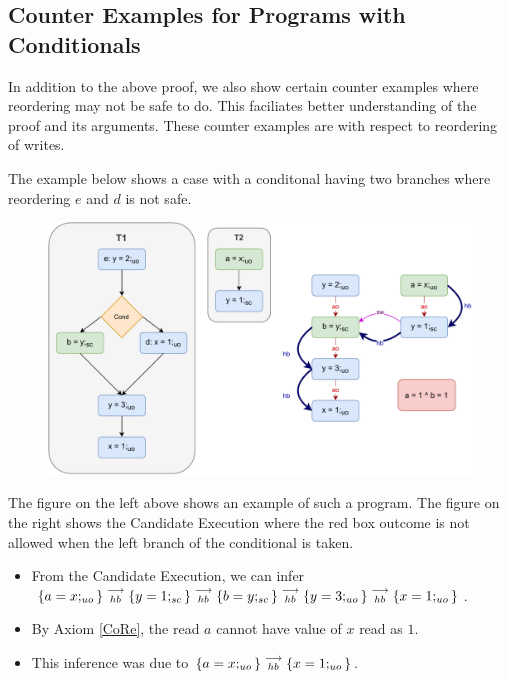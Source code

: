 \subsection{Counter Examples for Programs with Conditionals}
    
        In addition to the above proof, we also show certain counter examples where reordering may not be safe to do. This faciliates better understanding of the proof and its arguments. These counter examples are with respect to reordering of writes. 

     

        The example below shows a case with a conditonal having two branches where reordering $e$ and $d$ is not safe. 
        \begin{figure}[H]
            \centering 
            \includegraphics[scale=0.7]{5.InstructionReordering/5.ValidReorderingProgram/CounterExamples1a(Conditionals).pdf}
            \caption{}
        \end{figure}
        The figure on the left above shows an example of such a program.  
        The figure on the right shows the Candidate Execution where the red box outcome is not allowed when the left branch of the conditional is taken.
        \begin{itemize}
            \item From the Candidate Execution, we can infer $\{a=x;_{uo}\}\stackrel{\longrightarrow}{_{hb}}\{y=1;_{sc}\}\stackrel{\longrightarrow}{_{hb}}\{b=y;_{sc}\}\stackrel{\longrightarrow}{_{hb}}\{y=3;_{uo}\}\stackrel{\longrightarrow}{_{hb}}\{x=1;_{uo}\}$.
            \item By Axiom \ref{CoRe}, the read $a$ cannot have value of $x$ read as $1$. 
            \item This inference was due to $\{a=x;_{uo}\}\stackrel{\longrightarrow}{_{hb}}\{x=1;_{uo}\}$.
        \end{itemize}

